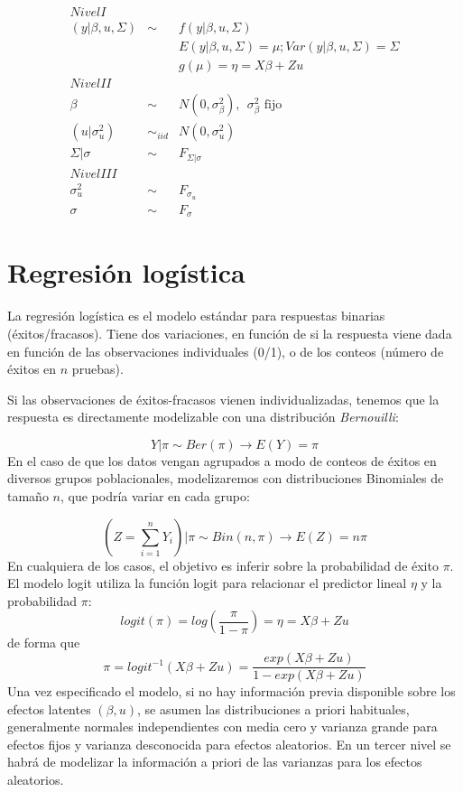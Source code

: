 \documentclass[
]{book}
\begin{document}
\begin{eqnarray*}
Nivel I &&\\
( y | \beta,u,\Sigma) &\sim & f(y|\beta,u,\Sigma) \\
&& E(y|\beta,u,\Sigma)=\mu;  Var(y|\beta,u,\Sigma)=\Sigma \\
&& g(\mu)=\eta=X\beta + Z u \\
Nivel II &&\\
\beta &\sim & N(0,\sigma_{\beta}^2), \ \ \sigma_{\beta}^2 \text{ fijo} \\
(u|\sigma_u^2) &\sim_{iid}&  N(0,{\sigma_u^2}) \\
\Sigma|\sigma &\sim& F_{\Sigma|\sigma} \\
Nivel III &&\\
\sigma_u^2 &\sim&  F_{\sigma_u} \\
\sigma &\sim&  F_{\sigma}
\end{eqnarray*}

\hypertarget{regresiuxf3n-loguxedstica}{%
\section{Regresión logística}\label{regresiuxf3n-loguxedstica}}

La regresión logística es el modelo estándar para respuestas binarias
(éxitos/fracasos). Tiene dos variaciones, en función de si la respuesta
viene dada en función de las observaciones individuales (0/1), o de los
conteos (número de éxitos en \(n\) pruebas).

Si las observaciones de éxitos-fracasos vienen individualizadas, tenemos
que la respuesta es directamente modelizable con una distribución
\emph{Bernouilli}:

\[Y|\pi \sim Ber(\pi) \rightarrow E(Y)=\pi\] En el caso de que los datos
vengan agrupados a modo de conteos de éxitos en diversos grupos
poblacionales, modelizaremos con distribuciones Binomiales de tamaño
\(n\), que podría variar en cada grupo:

\[(Z=\sum_{i=1}^n Y_i)|\pi\sim Bin(n,\pi)\rightarrow E(Z)=n\pi\] En
cualquiera de los casos, el objetivo es inferir sobre la probabilidad de
éxito \(\pi\). El modelo logit utiliza la función logit para relacionar el
predictor lineal \(\eta\) y la probabilidad \(\pi\):
\[logit(\pi)=log\left(\frac{\pi}{1-\pi}\right)=\eta=X\beta+Zu\] de forma
que
\[\pi=logit^{-1}(X\beta+Zu)=\frac{exp(X\beta+Zu)}{1-exp(X\beta+Zu)}\]
Una vez especificado el modelo, si no hay información previa disponible
sobre los efectos latentes \((\beta,u)\), se asumen las distribuciones a
priori habituales, generalmente normales independientes con media cero y
varianza grande para efectos fijos y varianza desconocida para efectos
aleatorios. En un tercer nivel se habrá de modelizar la información a
priori de las varianzas para los efectos aleatorios.
\end{document}
